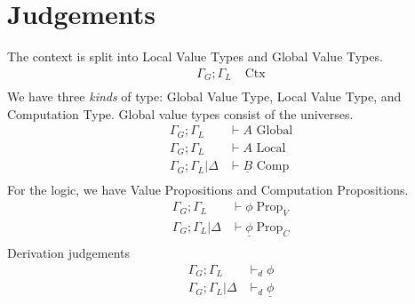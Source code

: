 \documentclass{article}
\begin{document}



\section{Judgements}
The context is split into Local Value Types and Global Value Types.
\begin{align*}
    \Gamma_G  ;\Gamma_L &\; \textrm{Ctx}\\
\end{align*}
We have three \textit{kinds} of type: Global Value Type, Local Value Type, and Computation Type.
Global value types consist of the universes.
\begin{align*}
    \Gamma_G ; \Gamma_L &\vdash A \textrm{ Global}\\
    \Gamma_G ; \Gamma_L &\vdash A \textrm{ Local}\\
    \Gamma_G ; \Gamma_L | \Delta &\vdash \underline{B} \textrm{ Comp}\\
\end{align*}
For the logic, we have Value Propositions and Computation Propositions.
\begin{align*}
    \Gamma_G ; \Gamma_L &\vdash \phi \; \textrm{Prop}_V\\
    \Gamma_G ; \Gamma_L | \Delta & \vdash \underline{\phi} \; \textrm{Prop}_C\\
\end{align*}
Derivation judgements
\begin{align*}
    \Gamma_G ; \Gamma_L &\vdash_d \phi \\ 
    \Gamma_G ; \Gamma_L | \Delta &\vdash_d \underline{\phi} \\ 
\end{align*}
\begin{comment}
    
\begin{align*}
    &\Gamma \vdash A  \textrm{ VType}_0\\\    
    &\Gamma \vdash A  \textrm{ VType}_1\\
    &\Gamma \vdash \underline{B}  \textrm{ CType}\\
    &\Gamma \vdash M : A \\
    &\Gamma | \Delta \vdash M : \underline{B}\\
    &\Gamma \vdash \phi  \textrm{ VProp} \\
    &\Gamma | \Delta \vdash \underline{\phi}  \textrm{ CProp}
\end{align*}
\begin{itemize}
    \item context judgements? (bunching rules, how contexts are constructed)
    \item relation judgement?
\end{itemize}
\end{comment}
\end{document}
